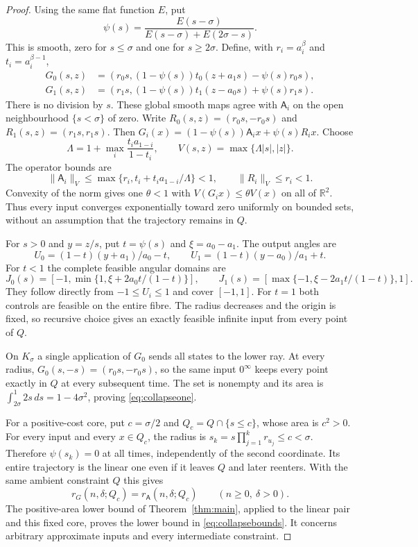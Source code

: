 \documentclass[11pt]{amsart}
\theoremstyle{definition}
\theoremstyle{remark}
\newcommand{\R}{\mathbb R}
\numberwithin{equation}{section}
\begin{document}
\begin{proof}
Using the same flat function $E$, put
\[
\psi(s)=\frac{E(s-\sigma)}{E(s-\sigma)+E(2\sigma-s)}.
\]
This is smooth, zero for $s\le\sigma$ and one for $s\ge2\sigma$.
Define, with $r_i=a_i^\beta$ and $t_i=a_i^{\beta-1}$,
\begin{equation}\label{eq:collapse}
\begin{split}
G_0(s,z)&=(r_0s,(1-\psi(s))t_0(z+a_1s)-\psi(s)r_0s),\\
G_1(s,z)&=(r_1s,(1-\psi(s))t_1(z-a_0s)+\psi(s)r_1s).
\end{split}
\end{equation}
There is no division by $s$. These global smooth maps agree with
$\mathsf A_i$ on the open neighbourhood $\{s<\sigma\}$ of zero.
Write $R_0(s,z)=(r_0s,-r_0s)$ and $R_1(s,z)=(r_1s,r_1s)$.
Then $G_i(x)=(1-\psi(s))\mathsf A_ix+\psi(s)R_ix$.
Choose
\[
\Lambda=1+\max_i\frac{t_i a_{1-i}}{1-t_i},\qquad
V(s,z)=\max\{\Lambda|s|,|z|\}.
\]
The operator bounds are
\[
\|\mathsf A_i\|_V\le
 \max\{r_i,t_i+t_i a_{1-i}/\Lambda\}<1,
\qquad \|R_i\|_V\le r_i<1.
\]
Convexity of the norm gives one $\theta<1$ with
$V(G_ix)\le\theta V(x)$ on all of $\R^2$. Thus every input
converges exponentially toward zero uniformly on bounded sets,
without an assumption that the trajectory remains in $Q$.

For $s>0$ and $y=z/s$, put $t=\psi(s)$ and $\xi=a_0-a_1$.
The output angles are
\[
U_0=(1-t)(y+a_1)/a_0-t,\qquad
U_1=(1-t)(y-a_0)/a_1+t.
\]
For $t<1$ the complete feasible angular domains are
\[
J_0(s)=\left[-1,\min\{1,\xi+2a_0t/(1-t)\}\right],\qquad
J_1(s)=\left[\max\{-1,\xi-2a_1t/(1-t)\},1\right].
\]
They follow directly from $-1\le U_i\le1$ and cover $[-1,1]$.
For $t=1$ both controls are feasible on the entire fibre.
The radius decreases and the origin is fixed, so recursive choice
gives an exactly feasible infinite input from every point of $Q$.

On $K_\sigma$ a single application of $G_0$ sends all states
to the lower ray. At every radius,
$G_0(s,-s)=(r_0s,-r_0s)$, so the same input $0^\infty$
keeps every point exactly in $Q$ at every subsequent time.
The set is nonempty and its area is
$\int_{2\sigma}^1 2s\,ds=1-4\sigma^2$, proving
\eqref{eq:collapseone}.

For a positive-cost core, put $c=\sigma/2$ and
$Q_c=Q\cap\{s\le c\}$, whose area is $c^2>0$.
For every input and every $x\in Q_c$, the radius is
$s_k=s\prod_{j=1}^k r_{u_j}\le c<\sigma$.
Therefore $\psi(s_k)=0$ at all times, independently of the
second coordinate. Its entire trajectory is the linear one even
if it leaves $Q$ and later reenters. With the same ambient
constraint $Q$ this gives
\begin{equation}\label{eq:collapsecore}
r_G(n,\delta;Q_c)=r_{\mathsf A}(n,\delta;Q_c)
                       \qquad(n\ge0,\ \delta>0).
\end{equation}
The positive-area lower bound of Theorem~\ref{thm:main}, applied
to the linear pair and this fixed core, proves the lower bound
in \eqref{eq:collapsebounds}. It concerns arbitrary approximate
inputs and every intermediate constraint.


\end{proof}
\end{document}

